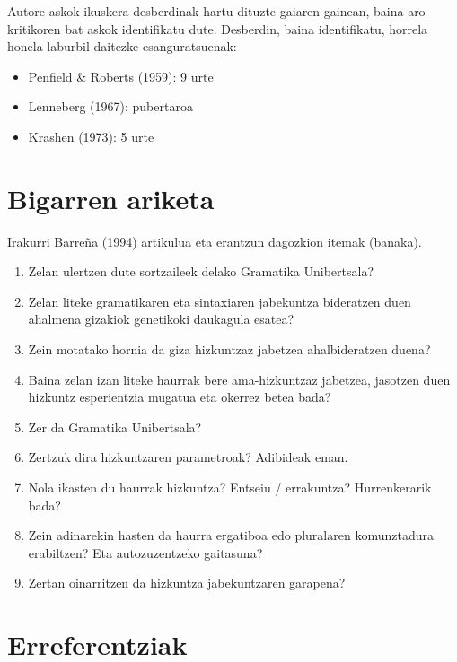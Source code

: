 \documentclass[
]{book}
\providecommand{\tightlist}{%
  \setlength{\itemsep}{0pt}\setlength{\parskip}{0pt}}
\begin{document}
Autore askok ikuskera desberdinak hartu dituzte gaiaren gainean, baina aro kritikoren bat askok identifikatu dute. Desberdin, baina identifikatu, horrela honela laburbil daitezke esanguratsuenak:

\begin{itemize}
\tightlist
\item
  Penfield \& Roberts (1959): 9 urte
\item
  Lenneberg (1967): pubertaroa
\item
  Krashen (1973): 5 urte
\end{itemize}

\hypertarget{T1A2}{%
\section*{Bigarren ariketa}\label{T1A2}}

Irakurri Barreña (1994) \href{https://zientzia.eus/artikuluak/chomskyren-arauak-eta-hizkuntz-jabekuntza/}{artikulua} eta erantzun dagozkion itemak (banaka).

\begin{enumerate}
\def\labelenumi{\arabic{enumi}.}
\tightlist
\item
  Zelan ulertzen dute sortzaileek delako Gramatika Unibertsala?
\item
  Zelan liteke gramatikaren eta sintaxiaren jabekuntza bideratzen duen ahalmena gizakiok genetikoki daukagula esatea?
\item
  Zein motatako hornia da giza hizkuntzaz jabetzea ahalbideratzen duena?
\item
  Baina zelan izan liteke haurrak bere ama-hizkuntzaz jabetzea, jasotzen duen hizkuntz esperientzia mugatua eta okerrez betea bada?
\item
  Zer da Gramatika Unibertsala?
\item
  Zertzuk dira hizkuntzaren parametroak? Adibideak eman.
\item
  Nola ikasten du haurrak hizkuntza? Entseiu / errakuntza? Hurrenkerarik bada?
\item
  Zein adinarekin hasten da haurra ergatiboa edo pluralaren komunztadura erabiltzen? Eta autozuzentzeko gaitasuna?
\item
  Zertan oinarritzen da hizkuntza jabekuntzaren garapena?
\end{enumerate}

\hypertarget{T1E}{%
\section*{Erreferentziak}\label{T1E}}
\end{document}
